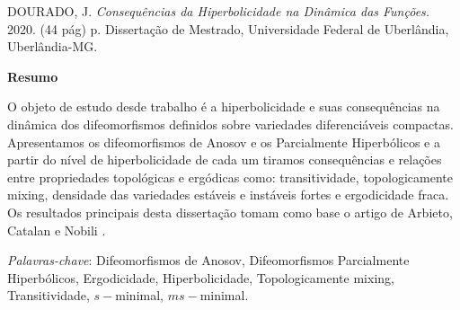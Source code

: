 %

\noindent DOURADO, J. \textit{Consequências da Hiperbolicidade na Dinâmica das Funções.} 2020. (44 pág) p. Dissertação de Mestrado, Universidade Federal de
Uberlândia, Uberlândia-MG.

\vspace{2cm}

\begin{center}
\textbf{Resumo}
\end{center}

\vspace{2cm}

\noindent O objeto de estudo desde trabalho é a hiperbolicidade e suas consequências na dinâmica dos difeomorfismos definidos sobre variedades diferenciáveis compactas. Apresentamos os difeomorfismos de Anosov e os Parcialmente Hiperbólicos e a partir do nível de hiperbolicidade de cada um tiramos consequências e relações entre propriedades topológicas e ergódicas como: transitividade, topologicamente mixing, densidade das variedades estáveis e instáveis fortes e ergodicidade fraca. Os resultados principais desta dissertação tomam como base o artigo de Arbieto, Catalan e Nobili \cite{art}. 

\bigskip

\noindent\textit{Palavras-chave}: Difeomorfismos de Anosov, Difeomorfismos Parcialmente Hiperbólicos, Ergodicidade, Hiperbolicidade, Topologicamente mixing, Transitividade, $s-$minimal, $ms-$minimal.

%

\newpage